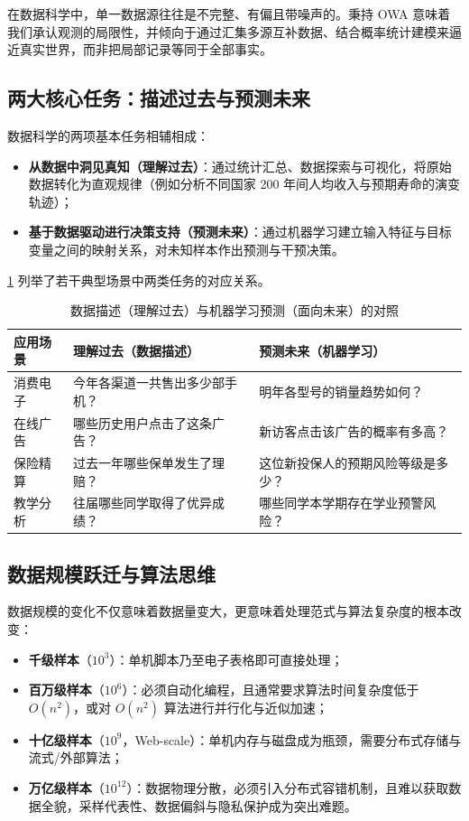 在数据科学中，单一数据源往往是不完整、有偏且带噪声的。秉持 OWA 意味着我们承认观测的局限性，并倾向于通过汇集多源互补数据、结合概率统计建模来逼近真实世界，而非把局部记录等同于全部事实。

\subsection{两大核心任务：描述过去与预测未来}

数据科学的两项基本任务相辅相成：
\begin{itemize}
  \item \textbf{从数据中洞见真知（理解过去）}：通过统计汇总、数据探索与可视化，将原始数据转化为直观规律（例如分析不同国家 200 年间人均收入与预期寿命的演变轨迹）；
  \item \textbf{基于数据驱动进行决策支持（预测未来）}：通过机器学习建立输入特征与目标变量之间的映射关系，对未知样本作出预测与干预决策。
\end{itemize}

\cref{tab:describe-vs-predict} 列举了若干典型场景中两类任务的对应关系。

\begin{table}[htbp]
  \centering
  \caption{数据描述（理解过去）与机器学习预测（面向未来）的对照}\label{tab:describe-vs-predict}
  \begin{tabular}{@{}lll@{}}
    \toprule
    应用场景 & 理解过去（数据描述） & 预测未来（机器学习） \\
    \midrule
    消费电子 & 今年各渠道一共售出多少部手机？ & 明年各型号的销量趋势如何？ \\
    在线广告 & 哪些历史用户点击了这条广告？ & 新访客点击该广告的概率有多高？ \\
    保险精算 & 过去一年哪些保单发生了理赔？ & 这位新投保人的预期风险等级是多少？ \\
    教学分析 & 往届哪些同学取得了优异成绩？ & 哪些同学本学期存在学业预警风险？ \\
    \bottomrule
  \end{tabular}
\end{table}

\subsection{数据规模跃迁与算法思维}

数据规模的变化不仅意味着数据量变大，更意味着处理范式与算法复杂度的根本改变：
\begin{itemize}
  \item \textbf{千级样本}（$10^3$）：单机脚本乃至电子表格即可直接处理；
  \item \textbf{百万级样本}（$10^6$）：必须自动化编程，且通常要求算法时间复杂度低于 $O(n^2)$，或对 $O(n^2)$ 算法进行并行化与近似加速；
  \item \textbf{十亿级样本}（$10^9$，Web-scale）：单机内存与磁盘成为瓶颈，需要分布式存储与流式/外部算法；
  \item \textbf{万亿级样本}（$10^{12}$）：数据物理分散，必须引入分布式容错机制，且难以获取数据全貌，采样代表性、数据偏斜与隐私保护成为突出难题。
\end{itemize}

